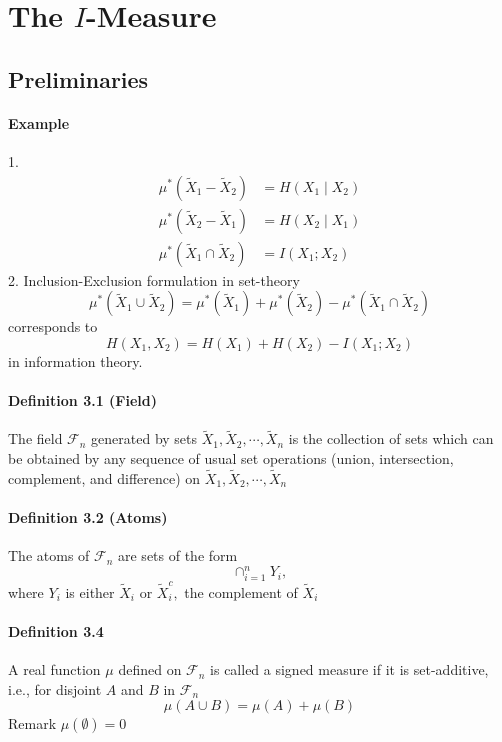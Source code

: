 \documentclass[8pt]{article}
\begin{document}
\section{The $I$-Measure}
\subsection{Preliminaries}
\paragraph{Example}
1.$$
\begin{aligned}
\mu^{*}\left(\tilde{X}_{1}-\tilde{X}_{2}\right) &=H\left(X_{1} \mid X_{2}\right) \\
\mu^{*}\left(\tilde{X}_{2}-\tilde{X}_{1}\right) &=H\left(X_{2} \mid X_{1}\right) \\
\mu^{*}\left(\tilde{X}_{1} \cap \tilde{X}_{2}\right) &=I\left(X_{1} ; X_{2}\right)
\end{aligned}
$$
2. Inclusion-Exclusion formulation in set-theory
$$
\mu^{*}\left(\tilde{X}_{1} \cup \tilde{X}_{2}\right)=\mu^{*}\left(\tilde{X}_{1}\right)+\mu^{*}\left(\tilde{X}_{2}\right)-\mu^{*}\left(\tilde{X}_{1} \cap \tilde{X}_{2}\right)
$$
corresponds to
$$
H\left(X_{1}, X_{2}\right)=H\left(X_{1}\right)+H\left(X_{2}\right)-I\left(X_{1} ; X_{2}\right)
$$
in information theory.

\paragraph{Definition 3.1 (Field)} The field $\mathcal{F}_{n}$ generated by sets $\tilde{X}_{1}, \tilde{X}_{2}, \cdots, \tilde{X}_{n}$ is the collection of sets which can be obtained by any sequence of usual set operations (union, intersection, complement, and difference) on $\tilde{X}_{1}, \tilde{X}_{2}, \cdots, \tilde{X}_{n}$

\paragraph{Definition 3.2 (Atoms)} The atoms of $\mathcal{F}_{n}$ are sets of the form $$\cap_{i=1}^{n} Y_{i},$$ where $Y_{i}$ is either $\tilde{X}_{i}$ or $\tilde{X}_{i}^{c},$ the complement of $\tilde{X}_{i}$

\paragraph{Definition 3.4} A real function $\mu$ defined on $\mathcal{F}_{n}$ is called a signed measure if it is set-additive, i.e., for disjoint $A$ and $B$ in $\mathcal{F}_{n}$
$$
\mu(A \cup B)=\mu(A)+\mu(B)
$$
Remark $\mu(\emptyset)=0$
\end{document}
